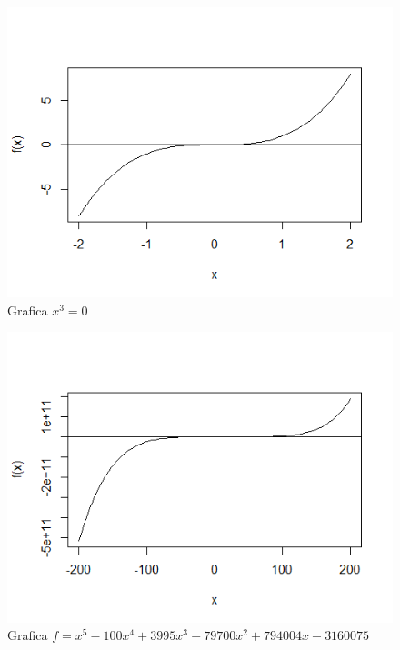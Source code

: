 \documentclass[12pt,a4paper]{article}
\begin{document}
\begin{figure}
	\centering                                         
	\includegraphics[scale = 1.0]{Ec1.png} 
	\caption{Grafica  $x^3=0$}           
\end{figure}

\begin{figure}
	\centering                                         
	\includegraphics[scale = 1.0]{Ec2.png} 
	\caption{Grafica  $f=x^5-100x^4+3995x^3-79700x^2+794004x-3160075$}            
\end{figure}



\end{document}
